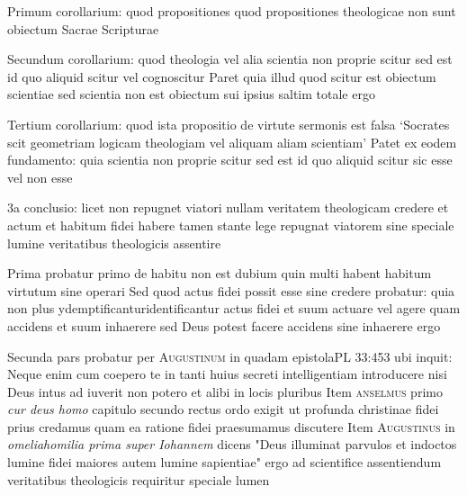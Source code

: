 \documentclass[twoside, openright]{article}
\newcommand{\name}[1]{\textsc{#1}}
\newcommand{\worktitle}[1]{\textit{#1}}
\begin{document}
        \pstart
        Primum corollarium: quod propositiones quod propositiones theologicae non sunt obiectum Sacrae Scripturae
        \pend
     
        \pstart
        Secundum corollarium: quod theologia vel alia scientia non proprie scitur sed est id quo aliquid scitur vel cognoscitur Paret quia illud quod scitur est obiectum scientiae sed scientia non est obiectum sui ipsius saltim totale ergo 
        \pend
     
        \pstart
        Tertium corollarium: quod ista propositio de virtute sermonis est falsa \enquote*{Socrates scit geometriam logicam theologiam vel aliquam aliam scientiam} Patet ex eodem fundamento: quia scientia non proprie scitur sed est id quo aliquid scitur sic esse vel non esse
        \pend
     
        \pstart
        3a conclusio: licet non repugnet viatori nullam veritatem theologicam credere et actum et habitum fidei habere tamen stante lege repugnat viatorem sine speciale lumine veritatibus theologicis assentire
        \pend
     
        \pstart
        Prima probatur primo de habitu non est dubium quin multi habent habitum virtutum sine operari Sed quod actus fidei possit esse sine credere probatur: quia non plus ydemptificanturidentificantur actus fidei et suum actuare vel agere quam accidens et suum inhaerere sed Deus potest facere accidens sine inhaerere ergo
        \pend
     
        \pstart
        Secunda pars probatur per \name{Augustinum} in quadam epistolaPL 33:453 ubi inquit: Neque enim cum coepero te in tanti huius secreti intelligentiam introducere nisi Deus intus ad iuverit non potero et alibi in locis pluribus Item \name{anselmus} primo \worktitle{cur deus homo}\index[works]{} capitulo secundo rectus ordo exigit ut profunda christinae fidei prius credamus quam ea ratione fidei praesumamus discutere Item \name{Augustinus} in \worktitle{omeliahomilia prima super Iohannem} dicens "Deus illuminat parvulos et indoctos lumine fidei maiores autem lumine sapientiae" ergo ad scientifice assentiendum veritatibus theologicis requiritur speciale lumen
        \pend
     
\end{document}
